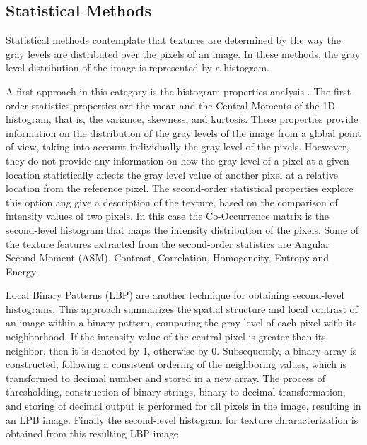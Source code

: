 %	

\subsection{Statistical Methods}
Statistical methods contemplate that textures are determined by the way the gray levels are distributed over the pixels of an image. In these methods, the gray level distribution of the image is represented by a histogram.

A first approach in this category is the histogram properties analysis \citep{Aggarwal.K.Agrawal:JSIP:2012}. The first-order statistics properties are the mean and the Central Moments of the 1D histogram, that is, the variance, skewness, and kurtosis. These properties provide information on the distribution of the gray levels of the image from a global point of view, taking into account individually the gray level of the pixels. Hoewever, they do not provide any information on how the gray level of a pixel at a given location statistically affects the gray level value of another pixel at a relative location from the reference pixel.
The second-order statistical properties explore this option ang give a description of the texture, based on the comparison of intensity values of two pixels. In this case the Co-Occurrence matrix \citep{Haralick.Shanmugam.ea:TSMC:1973} is the second-level histogram that maps the intensity distribution of the pixels. Some of the texture features extracted from the second-order statistics are Angular Second Moment (ASM), Contrast, Correlation, Homogeneity, Entropy and Energy.

Local Binary Patterns (LBP) \citep{Ojala.Pietikainen.ea:PR:1996} are another technique for obtaining second-level histograms. This approach summarizes the spatial structure and local contrast of an image within a binary pattern, comparing the gray level of each pixel with its neighborhood. If the intensity value of the central pixel is greater than its neighbor, then it is denoted by 1, otherwise by 0. Subsequently, a binary array is constructed, following a consistent ordering of the neighboring values, which is transformed to decimal number and stored in a new array. The process of thresholding, construction of binary strings, binary to decimal transformation, and storing of decimal output is performed for all pixels in the image, resulting in an LPB image. Finally the second-level histogram for texture chraracterization is obtained from this resulting LBP image.

